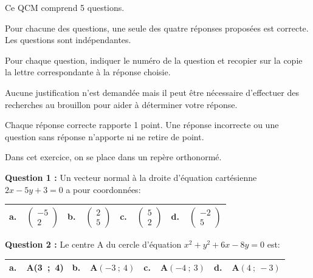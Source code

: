 \medskip


Ce QCM comprend 5 questions.

Pour chacune des questions, une seule des quatre réponses proposées est correcte.
Les questions sont indépendantes.

Pour chaque question, indiquer le numéro de la question et recopier sur la copie la lettre correspondante à la réponse choisie.

Aucune justification n'est demandée mais il peut être nécessaire d'effectuer des recherches au brouillon pour aider à déterminer votre réponse.

Chaque réponse correcte rapporte 1 point. Une réponse incorrecte ou une question sans réponse n'apporte ni ne retire de point.

Dans cet exercice, on se place dans un repère orthonormé.

\medskip


\textbf{Question 1 :} Un vecteur normal à la droite d'équation cartésienne $2x - 5y + 3 = 0$ a pour coordonnées:

\begin{center}
\begin{tabularx}{\linewidth}{|*{4}{X|}}\hline
\textbf{a.~~}$\begin{pmatrix}-5\\2 \end{pmatrix}$&\textbf{b.~~}$\begin{pmatrix}2\\5 \end{pmatrix}$&\textbf{c.~~}$\begin{pmatrix}5\\2 \end{pmatrix}$&\textbf{d.~~}$\begin{pmatrix}-2\\5 \end{pmatrix}$\\ \hline
\end{tabularx}
\end{center}

\textbf{Question 2 :} Le centre A du cercle d'équation $x^2+y^2 + 6x - 8y = 0$ est:

\begin{center}
\begin{tabularx}{\linewidth}{|*{4}{X|}}\hline
\textbf{a.~~}A(3~;~4)&\textbf{b.~~}A$(-3~;~4)$&\textbf{c.~~}A$(-4~;~3)$&\textbf{d.~~}A$(4~;~-3)$\\ \hline
\end{tabularx}
\end{center}

